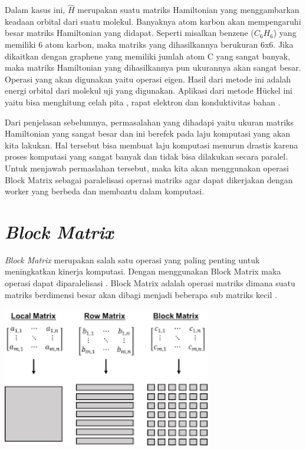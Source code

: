 \documentclass[12pt,a4paper]{report}
\begin{document}
	Dalam kasus ini, {$\hat{H}$} merupakan suatu matriks Hamiltonian yang menggambarkan keadaan orbital dari suatu molekul. Banyaknya atom karbon akan mempengaruhi besar matriks Hamiltonian yang didapat. Seperti misalkan benzene ({$C_6H_6$}) yang memiliki 6 atom karbon, maka matriks yang dihasilkannya berukuran 6x6.
	Jika dikaitkan dengan graphene yang memiliki jumlah atom C yang sangat banyak, maka matriks Hamiltonian yang dihasilkannya pun ukurannya akan sangat besar. Operasi yang akan digunakan yaitu operasi eigen. Hasil dari metode ini adalah energi orbital dari molekul uji yang digunakan. Aplikasi dari metode Hückel ini yaitu bisa menghitung celah pita \cite{Imamura2018}, rapat elektron dan konduktivitas bahan \cite{Siregar2014}.  
	
	Dari penjelasan sebelumnya, permasalahan yang dihadapi yaitu ukuran matriks Hamiltonian yang sangat besar dan ini berefek pada laju komputasi yang akan kita lakukan. Hal tersebut bisa membuat laju komputasi menurun drastis karena proses komputasi yang sangat banyak dan tidak bisa dilakukan secara paralel. Untuk menjawab permaslahan tersebut, maka kita akan menggunakan operasi Block Matrix sebagai paralelisasi operasi matriks agar dapat dikerjakan dengan worker yang berbeda dan membantu dalam komputasi. 
	
	\section{\textit{Block Matrix}}

	\textit{Block Matrix} merupakan salah satu operasi yang paling penting untuk meningkatkan kinerja komputasi. Dengan menggunakan Block Matrix maka operasi dapat diparalelisasi \cite{Davis2004}. Block Matrix adalah operasi matriks dimana suatu matriks berdimensi besar akan dibagi menjadi beberapa sub matriks kecil \cite{Ford2003}.
	
	\begin{center}
		\includegraphics[width=9.1cm]{gambar/blockmat.png}
	\end{center}
	
\end{document}

